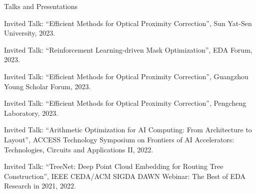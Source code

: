 \begin{rSection}{Talks and Presentations}
\begin{description}[font=\normalfont]
	\item[{[T6]}]{
		 Invited Talk: ``Efficient Methods for Optical Proximity Correction'', Sun Yat-Sen University, 2023.
	}
	\item[{[T5]}]{
		Invited Talk: ``Reinforcement Learning-driven Mask Optimization'', EDA Forum, 2023.
	}
	\item[{[T4]}]{
		Invited Talk: ``Efficient Methods for Optical Proximity Correction'', Guangzhou Young Scholar Forum, 2023.
	}
	\item[{[T3]}]{
		Invited Talk: ``Efficient Methods for Optical Proximity Correction'', Pengcheng Laboratory, 2023.
	}
	\item[{[T2]}]{
		Invited Talk: ``Arithmetic Optimization for AI Computing: From Architecture to Layout'', ACCESS Technology Symposium on Frontiers of AI Accelerators: Technologies, Circuits and Applications II, 2022.
	}
	\item[{[T1]}]{
		Invited Talk: ``TreeNet: Deep Point Cloud Embedding for Routing Tree Construction'', IEEE CEDA/ACM SIGDA DAWN Webinar: The Best of EDA Research in 2021, 2022.
	}
\end{description}
\end{rSection}